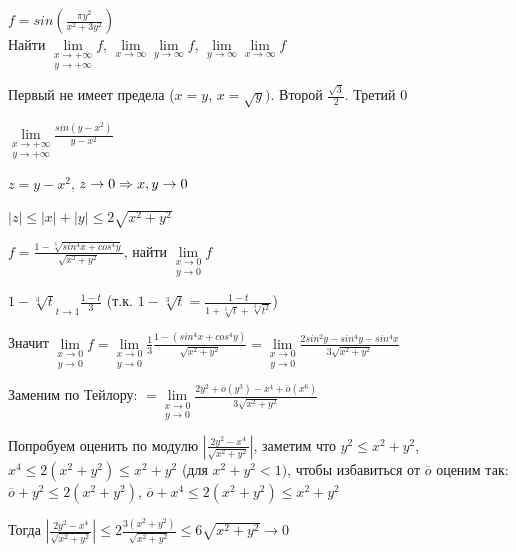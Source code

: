 \documentclass[11pt]{article}
\begin{document}
\begin{instance}
    $f=sin(\frac{\pi y^2}{x^2 + 3y^2})$\\
    Найти $\underset{y \rightarrow +\infty}{\lim\limits_{x \rightarrow +\infty}} f$, $\lim\limits_{x \rightarrow \infty} \lim\limits_{y \rightarrow \infty} f$, $\lim\limits_{y \rightarrow \infty} \lim\limits_{x \rightarrow \infty} f$
\end{instance}

\begin{reshenie}
    Первый не имеет предела ($x=y$, $x=\sqrt{y})$. Второй $\frac{\sqrt{3}}{2}$. Третий 0
\end{reshenie}

\begin{instance}
    $\underset{y \rightarrow +\infty}{\lim\limits_{x \rightarrow +\infty}} \frac{sin(y-x^2)}{y-x^2}$
\end{instance}

\begin{reshenie}
    $z=y-x^2$, $z \rightarrow 0 \Rightarrow x,y \rightarrow 0$
    
    $|z| \leqslant |x| + |y| \leqslant 2 \sqrt{x^2+y^2}$
\end{reshenie}

\begin{instance}
    $f=\frac{1-\sqrt[3]{sin^4 x + cos^4 y}}{\sqrt{x^2+y^2}}$, найти $\underset{y \rightarrow 0}{\lim\limits_{x \rightarrow 0}} f$
\end{instance}

\begin{reshenie}
    $1-\sqrt[3]{t} \underset{t \rightarrow 1}{~} \frac{1-t}{3}$ (т.к. $1-\sqrt[3]{t}=\frac{1-t}{1+\sqrt[5]{t}+\sqrt[3]{t^2}}$)
    
    Значит $\underset{y \rightarrow 0}{\lim\limits_{x \rightarrow 0}} f = \underset{y \rightarrow 0}{\lim\limits_{x \rightarrow 0}} \frac{1}{3} \frac{1-(sin^4 x + cos^4 y)}{\sqrt{x^2+y^2}} = \underset{y \rightarrow 0}{\lim\limits_{x \rightarrow 0}} \frac{2sin^2 y - sin^4 y - sin^4 x}{3 \sqrt{x^2+y^2}}$
    
    Заменим по Тейлору: $=\underset{y \rightarrow 0}{\lim\limits_{x \rightarrow 0}} \frac{2y^2 + \overline{o}(y^3)-x^4 + \overline{o}(x^6)}{3 \sqrt{x^2+y^2}}$
    
    Попробуем оценить по модулю $|\frac{2y^2-x^4}{\sqrt{x^2+y^2}}|$, заметим что $y^2 \leqslant x^2 + y^2$, $x^4 \leqslant 2(x^2+y^2) \leqslant x^2+y^2$ (для $x^2+y^2 < 1)$, чтобы избавиться от $\overline{o}$ оценим так: $\overline{o} + y^2 \leqslant 2(x^2 + y^2)$, $\overline{o} + x^4 \leqslant 2(x^2+y^2) \leqslant x^2+y^2$
    
    Тогда $|\frac{2y^2-x^4}{\sqrt{x^2+y^2}}| \leqslant 2 \frac{3(x^2+y^2)}{\sqrt{x^2+y^2}} \leqslant 6 \sqrt{x^2+y^2} \rightarrow 0$
\end{reshenie}
\end{document}
